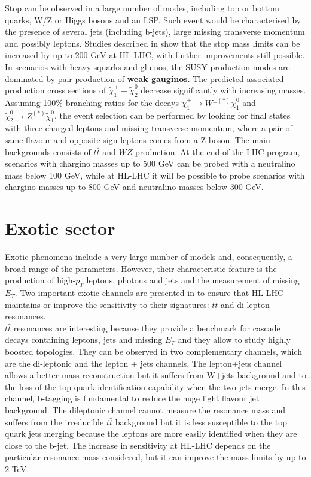 \documentclass[a4paper,twoside,12pt]{book}
\begin{document}
Stop can be observed in a large number of modes,
including top or bottom
quarks, W/Z or Higgs bosons and an LSP. Such event would be characterised by the presence
of several jets (including b-jets), large missing transverse momentum and possibly leptons. 
Studies described in \cite{loi} show that the stop mass limits can be increased by up to
200 GeV at HL-LHC, with further improvements still possible.\\

In scenarios with heavy squarks and gluinos, the SUSY production modes are dominated by 
pair production of \textbf{weak gauginos}. The predicted associated production cross sections of $\widetilde{\chi}_1^\pm - \widetilde{\chi}_2^0$  decrease significantly
with increasing masses. Assuming 100\% branching ratios for the decays
$\widetilde{\chi}_1^\pm \rightarrow W^{\pm(*)} \widetilde{\chi}_1^0$ and 
$\widetilde{\chi}_2^0 \rightarrow Z^{(*)}\widetilde{\chi}_1^0$, the event selection can be
performed by looking for final states with three charged leptons and missing transverse momentum,
where a pair of same flavour and opposite sign leptons comes from a Z boson. The main
backgrounds consists of $t\bar{t}$ and $WZ$ production.
At the end of the LHC program, scenarios with chargino masses up to 500 GeV can be probed
with a neutralino mass below 100 GeV, while at HL-LHC it will be possible to probe scenarios
with chargino masses up to 800 GeV and neutralino masses below 300 GeV.

\section{Exotic sector}
Exotic phenomena include a very large number of models and, consequently, a broad
range of the parameters. However, their characteristic feature is the production of high-$p_T$ 
leptons, photons and jets and the measurement of missing $E_T$. Two important exotic
channels are presented in \cite{loi} to ensure that HL-LHC maintains or improve the
sensitivity to their signatures: $t\bar{t}$ and di-lepton resonances.\\

$t\bar{t}$ resonances are interesting because they provide a benchmark for cascade
decays containing leptons, jets and missing $E_T$ and they allow to study highly boosted
topologies. They can be observed in two complementary channels, which are the di-leptonic and the lepton + jets channels.  The lepton+jets channel allows a better mass reconstruction but it suffers
from W+jets background and to the loss of the top quark identification capability when the two jets merge. In this channel, b-tagging is fundamental to reduce the huge light flavour jet
background. The dileptonic channel cannot measure the resonance mass and suffers from the irreducible $t\bar{t}$ background but
it is less susceptible to the top quark jets merging because the leptons are more easily 
identified when they are close to the b-jet.  The increase in sensitivity at HL-LHC depends
on the particular resonance mass considered, but it can improve the mass limits by up to
2 TeV.\\
\end{document}
